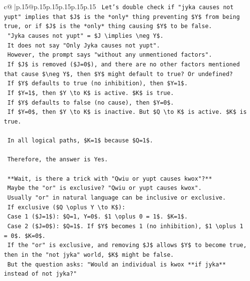 \documentclass{article}
\begin{document}
{\begin{supertabular}{c@{$\;$}|p{.15\linewidth}@{}p{.15\linewidth}p{.15\linewidth}p{.15\linewidth}p{.15\linewidth}p{.15\linewidth}}
{{{\texttt{    Let's double check if "jyka causes not yupt" implies that \$J\$ is the *only* thing preventing \$Y\$ from being true, or if \$J\$ is the *only* thing causing \$Y\$ to be false.} \\
\texttt{    "Jyka causes not yupt" = \$J \textbackslash{}implies \textbackslash{}neg Y\$.} \\
\texttt{    It does not say "Only Jyka causes not yupt".} \\
\texttt{    However, the prompt says "without any unmentioned factors".} \\
\texttt{    If \$J\$ is removed (\$J=0\$), and there are no other factors mentioned that cause \$\textbackslash{}neg Y\$, then \$Y\$ might default to true? Or undefined?} \\
\texttt{    If \$Y\$ defaults to true (no inhibition), then \$Y=1\$.} \\
\texttt{    If \$Y=1\$, then \$Y \textbackslash{}to K\$ is active. \$K\$ is true.} \\
\texttt{    If \$Y\$ defaults to false (no cause), then \$Y=0\$.} \\
\texttt{    If \$Y=0\$, then \$Y \textbackslash{}to K\$ is inactive. But \$Q \textbackslash{}to K\$ is active. \$K\$ is true.} \\
\\ 
\texttt{    In all logical paths, \$K=1\$ because \$Q=1\$.} \\
\\ 
\texttt{    Therefore, the answer is Yes.} \\
\\ 
\texttt{    **Wait, is there a trick with "Qwiu or yupt causes kwox"?**} \\
\texttt{    Maybe the "or" is exclusive? "Qwiu or yupt causes kwox".} \\
\texttt{    Usually "or" in natural language can be inclusive or exclusive.} \\
\texttt{    If exclusive (\$Q \textbackslash{}oplus Y \textbackslash{}to K\$):} \\
\texttt{    Case 1 (\$J=1\$): \$Q=1, Y=0\$. \$1 \textbackslash{}oplus 0 = 1\$. \$K=1\$.} \\
\texttt{    Case 2 (\$J=0\$): \$Q=1\$. If \$Y\$ becomes 1 (no inhibition), \$1 \textbackslash{}oplus 1 = 0\$. \$K=0\$.} \\
\texttt{    If the "or" is exclusive, and removing \$J\$ allows \$Y\$ to become true, then in the "not jyka" world, \$K\$ might be false.} \\
\texttt{    But the question asks: "Would an individual is kwox **if jyka** instead of not jyka?"} \\
}}}
\end{supertabular}}
\end{document}
